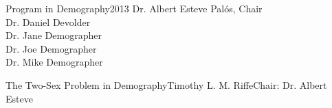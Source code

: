 





{Program in Demography}{2013}
{Dr. Albert Esteve Pal\'{o}s, Chair\\
 Dr. Daniel Devolder\\
 Dr. Jane Demographer\\
 Dr. Joe Demographer\\
 Dr. Mike Demographer}

\initializefrontsections



\makeatletter
\if@twoside \setcounter{page}{4} \else \setcounter{page}{1} \fi
\makeatother
 

\startacknowledgementspage

\label{Acknowledgements}

%

\tableofcontents      %
\listoffigures        %

\startabstractpage
{The Two-Sex Problem in Demography}{Timothy L. M. Riffe}{Chair: Dr. Albert Esteve}

\label{Abstract}

